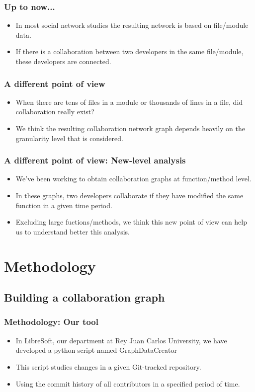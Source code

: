 \documentclass{beamer}
\begin{document}
\begin{frame}
\frametitle{Up to now...}
\begin{itemize}
\item In most social network studies the resulting network is based on file/module data.
\item If there is a collaboration between two developers in the same file/module, these developers are connected.
\end{itemize}
\end{frame}


\begin{frame}
\frametitle{A different point of view}
\begin{itemize}
\item When there are tens of files in a module or thousands of lines in a file, did collaboration really exist?
\item We think the resulting collaboration network graph depends heavily on the granularity level that is considered.
\end{itemize}
\end{frame}


\begin{frame}
\frametitle{A different point of view: New-level analysis}
\begin{itemize}
\item We've been working to obtain collaboration graphs at function/method level.
\item In these graphs, two developers collaborate if they have modified the same function in a given time period.
\item Excluding large fuctions/methods, we think this new point of view can help us to understand better this analysis.
\end{itemize}
\end{frame}

\section{Methodology}
\subsection{Building a collaboration graph}
\begin{frame}
\frametitle{Methodology: Our tool}
\begin{itemize}
\item In LibreSoft, our department at Rey Juan Carlos University,
we have developed a python script named GraphDataCreator 
\item This script studies changes in a given 
Git-tracked repository.
\item Using the commit history of all contributors in a specified period of time.
\end{itemize}
\end{frame}
\end{document}
